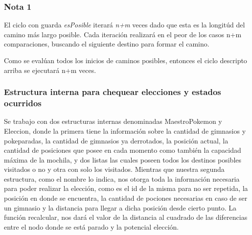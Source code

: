 \subsubsection{Nota 1}
El ciclo con guarda \textit{esPosible} iterará \textit{n+m} veces dado que esta es la longitúd del camino más largo posible. Cada iteración realizará en el peor de los casos n+m comparaciones, buscando el siguiente destino para formar el camino.

Como se evalúan todos los inicios de caminos posibles, entonces el ciclo descripto arriba se ejecutará n+m veces.


\subsubsection{Estructura interna para chequear elecciones y estados ocurridos}

Se trabajo con dos estructuras internas denominadas MaestroPokemon y Eleccion, donde la primera tiene la informaci\'on sobre la cantidad de gimnasios y pokeparadas, la cantidad de gimnasios ya derrotados, la posici\'on actual, la cantidad de posiciones que posee en cada momento como tambi\'en la capacidad m\'axima de la mochila, y dos listas las cuales poseen todos los destinos posibles visitados o no y otra con solo los visitados.
Mientras que nuestra segunda estructura, como el nombre lo indica, nos otorga toda la informaci\'on necesaria para poder realizar la elecci\'on, como es el id de la misma para no ser repetida, la posici\'on en donde se encuentra, la cantidad de pociones necesarias en caso de ser un gimnasio y la distancia para llegar a dicha posici\'on desde cierto punto.
La funci\'on recalcular, nos dar\'a el valor de la distancia al cuadrado de las diferencias entre el nodo donde se está parado y la potencial elección.

